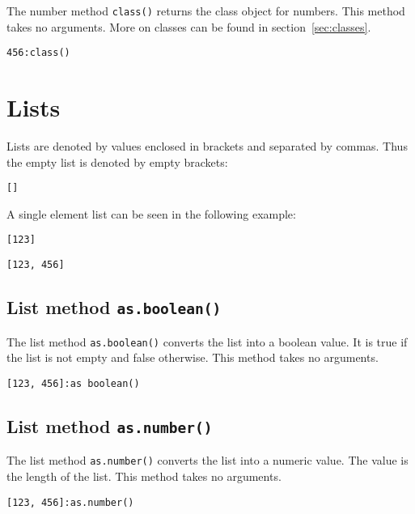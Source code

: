\documentclass[11pt,a4paper]{scrbook}
\begin{document}
The number method \texttt{class()} returns the class object for numbers. This
method takes no arguments. More on classes can be found in
section~\ref{sec:classes}.

\begin{lstlisting}[language=BibTool]
456:class()
\end{lstlisting}


\section{Lists}

Lists are denoted by values enclosed in brackets and separated by commas.
Thus the empty list is denoted by empty brackets:

\begin{lstlisting}[language=BibTool]
[]
\end{lstlisting}

A single element list can be seen in the following example:

\begin{lstlisting}[language=BibTool]
[123]
\end{lstlisting}

\begin{lstlisting}[language=BibTool]
[123, 456]
\end{lstlisting}

\subsection{List method \texttt{as.boolean()}}

The list method \texttt{as.boolean()} converts the list into a boolean value.
It is true if the list is not empty and false otherwise. This method takes no
arguments.

\begin{lstlisting}[language=BibTool]
[123, 456]:as boolean()
\end{lstlisting}

\subsection{List method \texttt{as.number()}}

The list method \texttt{as.number()} converts the list into a numeric value.
The value is the length of the list. This method takes no arguments.

\begin{lstlisting}[language=BibTool]
[123, 456]:as.number()
\end{lstlisting}
\end{document}
